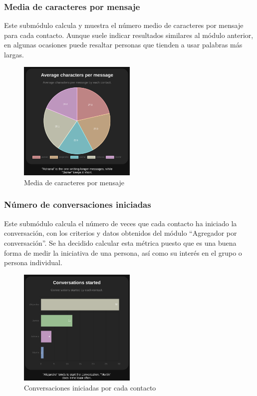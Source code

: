 
\subsubsection{Media de caracteres por mensaje}

Este submódulo calcula y muestra el número medio de caracteres por mensaje para cada contacto. Aunque suele indicar resultados similares al módulo anterior, en algunas ocasiones puede resaltar personas que tienden a usar palabras más largas.

\begin{figure}[H]
	\centering
	\includegraphics[width=0.5\textwidth]{img/char_avg.png}
	\caption{Media de caracteres por mensaje}
	\label{fig:chap4:char_avg}
\end{figure}


\subsubsection{Número de conversaciones iniciadas}

Este submódulo calcula el número de veces que cada contacto ha iniciado la conversación, con los criterios y datos obtenidos del módulo ``Agregador por conversación''. Se ha decidido calcular esta métrica puesto que es una buena forma de medir la iniciativa de una persona, así como su interés en el grupo o persona individual.

\begin{figure}[H]
	\centering
	\includegraphics[width=0.5\textwidth]{img/conversations_started.png}
	\caption{Conversaciones iniciadas por cada contacto}
	\label{fig:chap4:conversations_started}
\end{figure}

